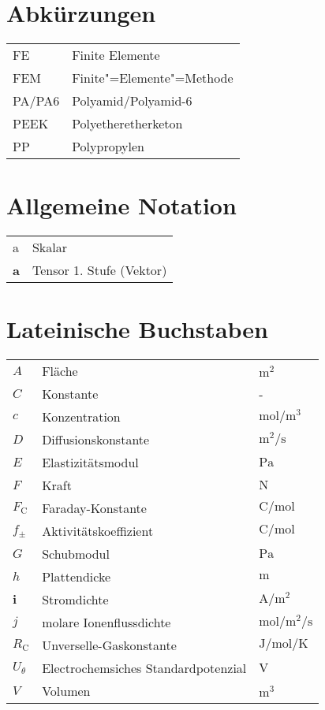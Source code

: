 {\renewcommand*{\arraystretch}{1.2}%

\section*{Abkürzungen}

\begin{longtable}{@{}p{\TabulatorVZ}@{}p{\TabulatorTX+\TabulatorEH+2\tabcolsep}@{}}
FE								& Finite Elemente \\
FEM								& Finite"=Elemente"=Methode \\
PA/PA6						& Polyamid/Polyamid-6 \\
PEEK    	        & Polyetheretherketon \\
PP								& Polypropylen

\end{longtable}

\section*{Allgemeine Notation}

\begin{longtable}{@{}p{\TabulatorVZ}@{}p{\TabulatorTX+\TabulatorEH+2\tabcolsep}@{}}
a									& Skalar \\
\textbf{a}				& Tensor 1. Stufe (Vektor)
\end{longtable}

\section*{Lateinische Buchstaben}

\begin{longtable}{@{}p{\TabulatorVZ}@{}p{\TabulatorTX}p{\TabulatorEH}@{}}
	$A$		& Fläche					& $\si{\metre\squared}$ \\
	$C$		& Konstante					& -					\\
	$c$		& Konzentration				& $\si{\mole\per\metre\cubed}$\\
	$D$		& Diffusionskonstante		& $\si{\metre\squared\per\second}$\\
	$E$		& Elastizitätsmodul			& $\si{\pascal}$	\\
	$F$		& Kraft						& $\si{\newton}$	\\
	$F_{\text{C}}$		& Faraday-Konstante		& $\si{\coulomb\per\mole}$	\\
	$f_{\pm}$		& Aktivitätskoeffizient		& $\si{\coulomb\per\mole}$	\\
	$G$		& Schubmodul			& $\si{\pascal}$	\\
	$h$		& Plattendicke				& $\si{\metre}$		\\
	$\textbf{i}$		& Stromdichte				& $\si{\ampere\per\metre\squared}$		\\
	$j$		& molare Ionenflussdichte				& $\si{\mole\per\metre\squared\per\second}$		\\
	$R_{\text{C}}$		& Unverselle-Gaskonstante		& $\si{\joule\per\mole\per\kelvin}$	\\
	$U_{\theta}$ & Electrochemsiches Standardpotenzial	& $\si{\volt}$ \\
	$V$		& Volumen			& $\si{\cubic\metre}$
\end{longtable}

}
